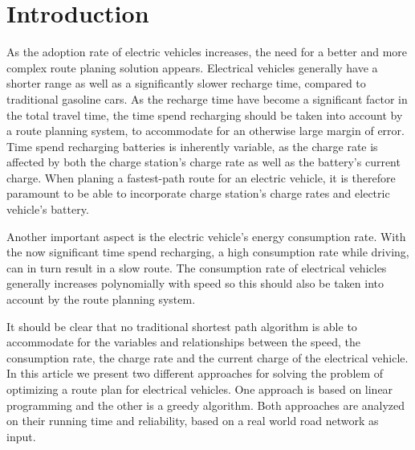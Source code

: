 \section{Introduction}

As the adoption rate of electric vehicles increases, the need for a better and more complex route planing solution appears. Electrical vehicles generally have a shorter range as well as a significantly slower recharge time, compared to traditional gasoline cars. As the recharge time have become a significant factor in the total travel time, the time spend recharging should be taken into account by a route planning system, to accommodate for an otherwise large margin of error. Time spend recharging batteries is inherently variable, as the charge rate is affected by both the charge station's charge rate as well as the battery's current charge. When planing a fastest-path route for an electric vehicle, it is therefore paramount to be able to incorporate charge station's charge rates and electric vehicle's battery.

Another important aspect is the electric vehicle's energy consumption rate. With the now significant time spend recharging, a high consumption rate while driving, can in turn result in a slow route. The consumption rate of electrical vehicles generally increases polynomially with speed so this should also be taken into account by the route planning system.

It should be clear that no traditional shortest path algorithm is able to accommodate for the variables and relationships between the speed, the consumption rate, the charge rate and the current charge of the electrical vehicle. In this article we present two different approaches for solving the problem of optimizing a route plan for electrical vehicles. One approach is based on linear programming and the other is a greedy algorithm. Both approaches are analyzed on their running time and reliability, based on a real world road network as input.




